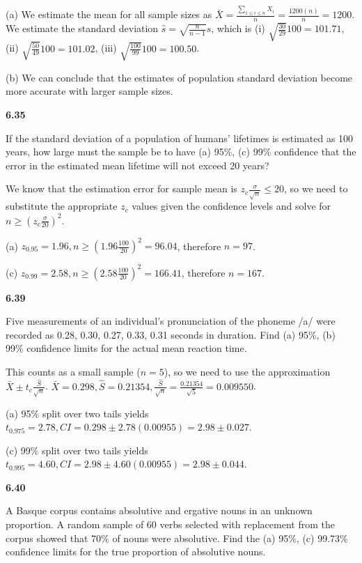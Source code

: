 \documentclass[11pt,letterpaper]{scrartcl}
\begin{document}
(a) We estimate the mean for all sample sizes as $\bar{X} = \frac{\sum_{1\leq i \leq n} X_{i}}{n}=\frac{1200(n)}{n} = 1200$.
We estimate the standard deviation $\hat{s} = \sqrt{\frac{n}{n-1}}s$, which is (i) $\sqrt{\frac{30}{29}}100=101.71$, (ii) $\sqrt{\frac{50}{49}}100 = 101.02$, (iii) $\sqrt{\frac{100}{99}}100 = 100.50$.

(b) We can conclude that the estimates of population standard deviation become more accurate with larger sample sizes. 

\textbf{6.35}

If the standard deviation of a population of humans' lifetimes is estimated as 100 years, how large must the sample be to have (a) 95\%, (c) 99\% confidence that the error in the estimated mean lifetime will not exceed 20 years?

We know that the estimation error for sample mean is $z_{c}\frac{\sigma}{\sqrt{n}} \leq 20$, so we need to substitute the appropriate $z_{c}$ values given the confidence levels and solve for $n \geq (z_{c}\frac{\sigma}{20})^{2}$. 

(a) $z_{0.95} = 1.96, n \geq (1.96\frac{100}{20})^{2} = 96.04$, therefore $n=97$.

(c) $z_{0.99} = 2.58, n \geq (2.58\frac{100}{20})^{2} = 166.41$, therefore $n=167$.

\textbf{6.39}

Five measurements of an individual's pronunciation of the phoneme /a/ were recorded as 0.28, 0.30, 0.27, 0.33, 0.31 seconds in duration. 
Find (a) 95\%, (b) 99\% confidence limits for the actual mean reaction time.

This counts as a small sample ($n=5$), so we need to use the approximation $\bar{X} \pm t_{c}\frac{\hat{S}}{\sqrt{n}}$.
$\bar{X} = 0.298, \hat{S} = 0.21354, \frac{\hat{S}}{\sqrt{n}} = \frac{0.21354}{\sqrt{5}} = 0.009550$.

(a) 95\% split over two tails yields $t_{0.975}=2.78, CI = 0.298 \pm 2.78(0.00955) = 2.98 \pm 0.027$.

(c) 99\% split over two tails yields $t_{0.995} = 4.60, CI = 2.98 \pm 4.60(0.00955) = 2.98 \pm 0.044$.

\textbf{6.40}

A Basque corpus contains absolutive and ergative nouns in an unknown proportion. 
A random sample of 60 verbs selected with replacement from the corpus showed that 70\% of nouns were absolutive. 
Find the (a) 95\%, (c) 99.73\% confidence limits for the true proportion of absolutive nouns.
\end{document}

